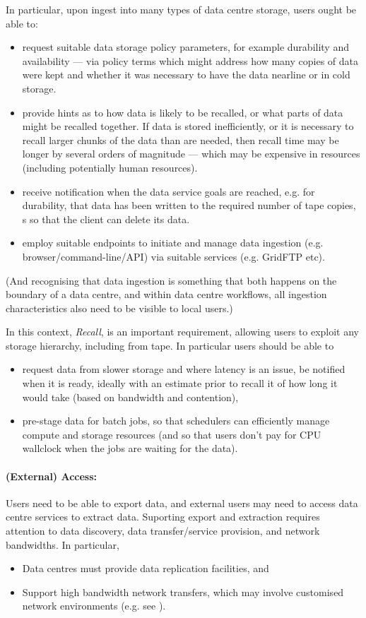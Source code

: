 In particular, upon ingest into many types of data centre storage, users ought be
able to:
\begin{itemize}
\item request suitable data storage policy parameters, for example
durability and availability --- via policy terms which might address how
many copies of data were kept and whether it was necessary to have the data
nearline or in cold storage.
\item provide hints as to how data is likely to be recalled, or what parts
of data might be recalled together. If data is stored inefficiently, or
it is necessary to recall larger chunks of the data than are needed, then
recall time may be longer by several orders of magnitude --- which may
be expensive in resources (including potentially human resources).
\item receive notification when the data service goals are reached, e.g. for
durability, that data has been written to the required number of tape copies, s
so that the client can delete its data.
\item employ suitable endpoints to initiate and manage data ingestion (e.g.
browser/command-line/API) via suitable services (e.g. GridFTP etc).
\end{itemize}
(And recognising that data ingestion is something that both happens on the
boundary of a data centre, and within data centre workflows, all
ingestion characteristics also need to be visible to local users.)

In this context, \textit{Recall}, is an important requirement, allowing
users to exploit any storage hierarchy, including from tape. In particular
users should be able to
\begin{itemize}
    \item request data from slower storage and where latency is an issue, be
notified when it is ready, ideally with an estimate prior to recall it of how
long it would take (based on bandwidth and contention),
    \item pre-stage data for batch jobs, so that schedulers can efficiently
    manage compute and storage resources (and so that users don't pay for CPU
    wallclock when the jobs are waiting for the data).
\end{itemize}

\paragraph{(External) Access:}
Users need to be able to export data, and external users may need to access data centre
services to extract data. Suporting export and extraction requires attention to data
discovery, data transfer/service provision, and network bandwidths. In particular,
\begin{itemize}
        \item  Data centres must provide data replication facilities, and
        \item Support high bandwidth network transfers, which may involve
        customised network environments (e.g. see ).
\end{itemize}

